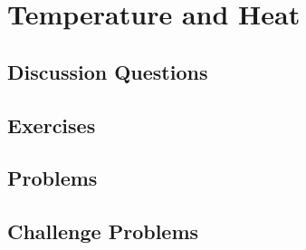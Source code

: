 
\chapter{Temperature and Heat}

\section{Discussion Questions}

\section{Exercises}

\section{Problems}

\section{Challenge Problems}
